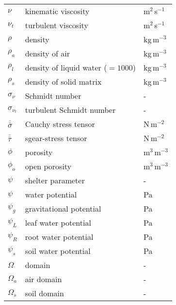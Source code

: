 \begin{longtable}{p{}p{}p{}}
	$\nu$ & kinematic viscosity & m$^2$\,s$^{-1}$ \\ 
	$\nu_t$ & turbulent viscosity & m$^2$\,s$^{-1}$ \\ 


	$\rho$ & density & kg\,m$^{-3}$ \\ 
	$\rho_a$ & density of air & kg\,m$^{-3}$ \\ 		
	$\rho_l$ & density of liquid water ($=\num{1000}$) & kg\,m$^{-3}$ \\ 	
	$\rho_s$ & density of solid matrix & kg\,m$^{-3}$ \\ 		

	$\sigma_{\nu}$ & Schmidt number & - \\ 	
	$\sigma_{\nu_t}$ & turbulent Schmidt number & - \\ 		
	$\bar{\bar{\sigma}}$ & Cauchy stress tensor & N\,m$^{-2}$ \\ 		

	$\bar{\bar{\tau}}$ & sgear-stress tensor & N\,m$^{-2}$ \\ 		
	$\phi$ & porosity & m$^{3}$\,m$^{-3}$ \\
	$\phi_o$ & open porosity & m$^{3}$\,m$^{-3}$ \\
	$\psi$ & shelter parameter & - \\
	$\psi$ & water potential & Pa \\	
	$\psi_g$ & gravitational potential & Pa \\	
	$\psi_L$ & leaf water potential & Pa \\
	$\psi_R$ & root water potential & Pa \\
	$\psi_s$ & soil water potential & Pa \\	

	$\Omega$ & domain & - \\
	$\Omega_a$ & air domain & - \\		
	$\Omega_s$ & soil domain & - \\	


\end{longtable}
%
